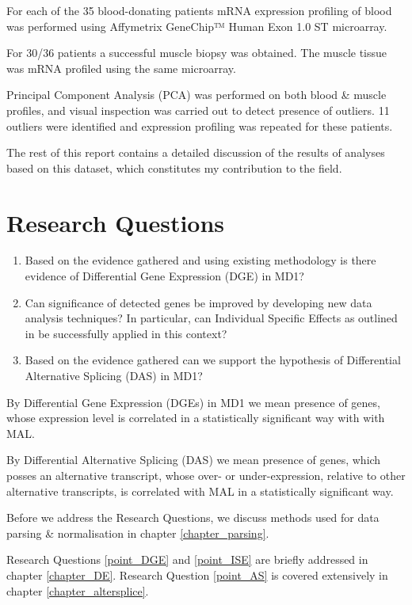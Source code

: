 For each of the 35 blood-donating patients mRNA expression profiling of blood was performed using Affymetrix GeneChip™ Human Exon 1.0 ST microarray.

For 30/36 patients a successful muscle biopsy was obtained. The muscle tissue was mRNA profiled using the same microarray.

Principal Component Analysis (PCA) was performed on both blood \& muscle profiles, and visual inspection was carried out to detect presence of outliers. 11 outliers were identified and expression profiling was repeated for these patients.

The rest of this report contains a detailed discussion of the results of analyses based on this dataset, which constitutes my contribution to the field.

\section{Research Questions} \label{chapter_researchquestion}

\begin{enumerate}
\item \label{point_DGE} Based on the evidence gathered and using existing methodology is there evidence of Differential Gene Expression (DGE) in MD1?
\item \label{point_ISE} Can significance of detected genes be improved by developing new data analysis techniques? In particular, can Individual Specific Effects as outlined in \parencite{Kurkiewicz2017} be successfully applied in this context?
\item \label{point_AS} Based on the evidence gathered can we support the hypothesis of Differential Alternative Splicing (DAS) in MD1?
\end{enumerate}

By Differential Gene Expression (DGEs) in MD1 we mean presence of genes, whose expression level is correlated in a statistically significant way with with MAL.

By Differential Alternative Splicing (DAS) we mean presence of genes, which posses an alternative transcript, whose over- or under-expression, relative to other alternative transcripts, is correlated with MAL in a statistically significant way.

Before we address the Research Questions, we discuss methods used for data parsing \& normalisation in chapter \ref{chapter_parsing}.

Research Questions \ref{point_DGE} and \ref{point_ISE} are briefly addressed in chapter \ref{chapter_DE}. Research Question \ref{point_AS} is covered extensively in chapter \ref{chapter_altersplice}.

